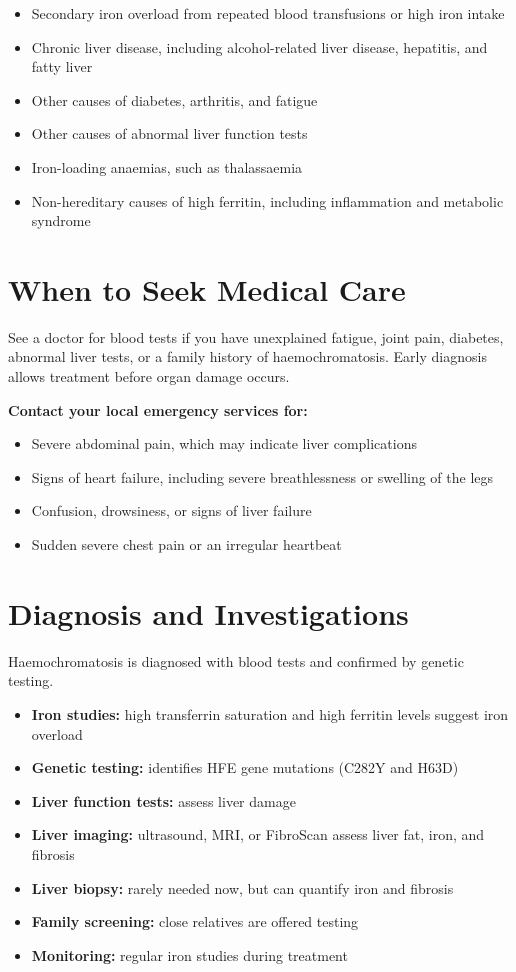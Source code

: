 \begin{itemize}
    \item Secondary iron overload from repeated blood transfusions or high iron intake
    \item Chronic liver disease, including alcohol-related liver disease, hepatitis, and fatty liver
    \item Other causes of diabetes, arthritis, and fatigue
    \item Other causes of abnormal liver function tests
    \item Iron-loading anaemias, such as thalassaemia
    \item Non-hereditary causes of high ferritin, including inflammation and metabolic syndrome
\end{itemize}

\section*{When to Seek Medical Care}
See a doctor for blood tests if you have unexplained fatigue, joint pain, diabetes, abnormal liver tests, or a family history of haemochromatosis. Early diagnosis allows treatment before organ damage occurs.

\textbf{Contact your local emergency services for:}
\begin{itemize}
    \item Severe abdominal pain, which may indicate liver complications
    \item Signs of heart failure, including severe breathlessness or swelling of the legs
    \item Confusion, drowsiness, or signs of liver failure
    \item Sudden severe chest pain or an irregular heartbeat
\end{itemize}

\section*{Diagnosis and Investigations}
Haemochromatosis is diagnosed with blood tests and confirmed by genetic testing.

\begin{itemize}
    \item \textbf{Iron studies:} high transferrin saturation and high ferritin levels suggest iron overload
    \item \textbf{Genetic testing:} identifies HFE gene mutations (C282Y and H63D)
    \item \textbf{Liver function tests:} assess liver damage
    \item \textbf{Liver imaging:} ultrasound, MRI, or FibroScan assess liver fat, iron, and fibrosis
    \item \textbf{Liver biopsy:} rarely needed now, but can quantify iron and fibrosis
    \item \textbf{Family screening:} close relatives are offered testing
    \item \textbf{Monitoring:} regular iron studies during treatment
\end{itemize}

